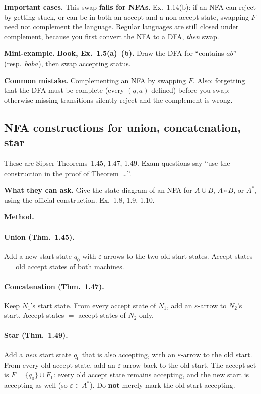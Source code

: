 \documentclass[11pt,a4paper]{article}
\newcommand{\eps}{\varepsilon}
\begin{document}
\textbf{Important cases.}
This swap \textbf{fails for NFAs}. Ex.~1.14(b): if an NFA can reject
by getting stuck, or can be in both an accept and a non-accept state,
swapping $F$ need not complement the language. Regular languages are
still closed under complement, because you first convert the NFA to a
DFA, \emph{then} swap.

\textbf{Mini-example.}
\textbf{Book, Ex.~1.5(a)--(b).} Draw the DFA for ``contains $ab$''
(resp.\ $baba$), then swap accepting status.

\textbf{Common mistake.}
Complementing an NFA by swapping $F$. Also: forgetting that the DFA
must be complete (every $(q,a)$ defined) before you swap; otherwise
missing transitions silently reject and the complement is wrong.

\subsection{NFA constructions for union, concatenation, star}
\label{type:nfa-ops}

These are Sipser Theorems~1.45, 1.47, 1.49. Exam questions say
``use the construction in the proof of Theorem~\ldots''.

\textbf{What they can ask.}
Give the state diagram of an NFA for $A\cup B$, $A\circ B$, or $A^*$,
using the official construction. Ex.~1.8, 1.9, 1.10.

\textbf{Method.}

\paragraph{Union (Thm.~1.45).}
Add a new start state $q_0$ with $\eps$-arrows to the two old start
states. Accept states $=$ old accept states of both machines.

\paragraph{Concatenation (Thm.~1.47).}
Keep $N_1$'s start state. From every accept state of $N_1$, add an
$\eps$-arrow to $N_2$'s start. Accept states $=$ accept states of
$N_2$ only.

\paragraph{Star (Thm.~1.49).}
Add a \emph{new} start state $q_0$ that is also accepting, with an
$\eps$-arrow to the old start. From every old accept state, add an
$\eps$-arrow back to the old start. The accept set is
$F=\{q_0\}\cup F_1$: every old accept state remains accepting, and
the new start is accepting as well (so $\eps\in A^*$). Do
\textbf{not} merely mark the old start accepting.
\end{document}
